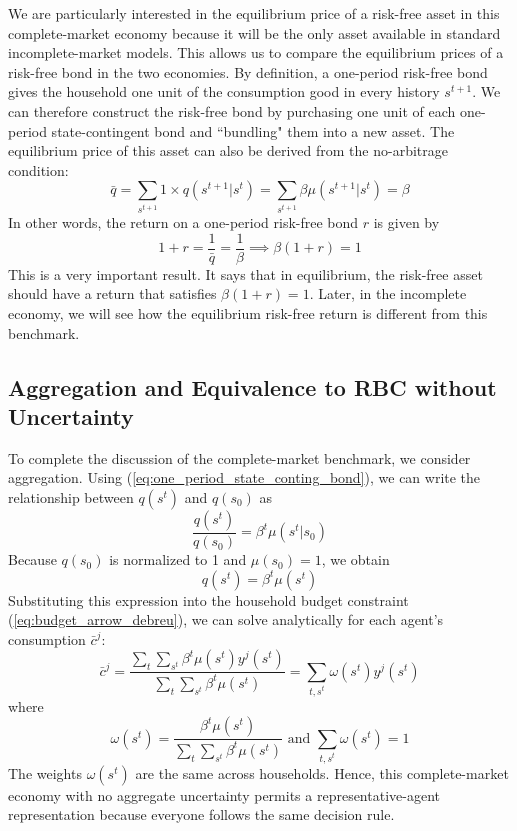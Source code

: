 \documentclass[12pt]{article}
\begin{document}
We are particularly interested in the equilibrium price of a risk-free asset in this complete-market economy because it will be the only asset available in standard incomplete-market models. This allows us to compare the equilibrium prices of a risk-free bond in the two economies. By definition, a one-period risk-free bond gives the household one unit of the consumption good in every history $s^{t+1}$. We can therefore construct the risk-free bond by purchasing one unit of each one-period state-contingent bond and ``bundling" them into a new asset. The equilibrium price of this asset can also be derived from the no-arbitrage condition:
\begin{equation}
	\bar{q} = \sum_{s^{t+1}} 1 \times q(s^{t+1}|s^t) = \sum_{s^{t+1}} \beta \mu(s^{t+1}|s^t) = \beta
\end{equation}
In other words, the return on a one-period risk-free bond $r$ is given by
\begin{equation}
	1+r = \frac{1}{\bar{q}} = \frac{1}{\beta} \implies \beta (1+r) = 1 
\end{equation}
This is a very important result. It says that in equilibrium, the risk-free asset should have a return that satisfies $\beta (1+r) = 1$. Later, in the incomplete economy, we will see how the equilibrium risk-free return is different from this benchmark.

\subsection{Aggregation and Equivalence to RBC without Uncertainty}
To complete the discussion of the complete-market benchmark, we consider aggregation. Using (\ref{eq:one_period_state_conting_bond}), we can write the relationship between $q(s^{t})$ and $q(s_0)$ as
\begin{equation}
	\frac{q(s^t)}{q(s_0)} = \beta^t \mu(s^t|s_0)
\end{equation} 
Because $q(s_0)$ is normalized to 1 and $\mu(s_0) = 1$, we obtain 
\begin{equation}
	q(s^t) = \beta^t \mu(s^t)
\end{equation}
Substituting this expression into the household budget constraint (\ref{eq:budget_arrow_debreu}), we can solve analytically for each agent's consumption $\bar{c}^j$:
\begin{equation}
	\bar{c}^j = \frac{\sum_t \sum_{s^t} \beta^t \mu(s^t) y^j(s^t)}{\sum_{t} \sum_{s^t} \beta^t \mu(s^t)} = \sum_{t, s^t} \omega(s^t) y^j(s^t) 
\end{equation}
where 
\[\omega(s^t) = \frac{\beta^t \mu(s^t)}{\sum_{t} \sum_{s^t} \beta^t \mu(s^t)} \text{ and } \sum_{t, s^t} \omega(s^t) = 1\]
The weights $\omega(s^t)$ are the same across households. Hence, this complete-market economy with no aggregate uncertainty permits a representative-agent representation because everyone follows the same decision rule.
\end{document}
